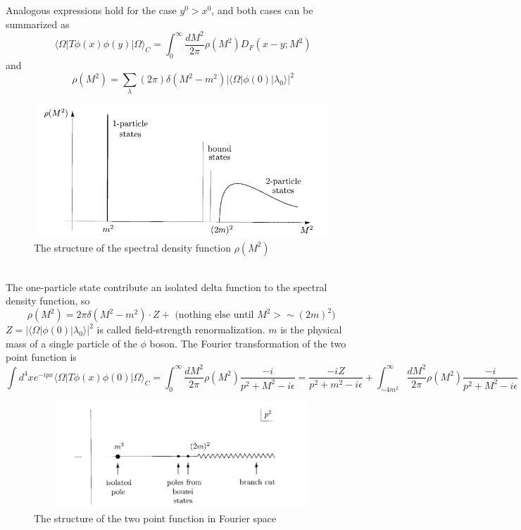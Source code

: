 \documentclass{article}
\begin{document}
Analogous expressions hold for the case $y^0 > x^0$, and both cases can be summarized as
\[\langle \Omega | T \phi(x) \phi(y) | \Omega \rangle_C = \int_0^{\infty} \frac{dM^2}{2\pi} \rho(M^2) D_F(x-y;M^2)\]
and 
\[\rho(M^2) = \sum_{\lambda} (2\pi) \delta(M^2-m^2)|\langle \Omega | \phi(0) | \lambda_0 \rangle|^2 \]
\begin{figure}[!h]
\centering
\includegraphics[height=5cm ,width=12cm]{./pic/FSR2.png}
\caption*{The structure of the spectral density function $\rho(M^2)$}
\end{figure}\\
The one-particle state contribute an isolated delta function to the spectral density function, so
\[\rho(M^2) = 2\pi \delta (M^2 -m^2) \cdot Z + \mbox{ (nothing else until $M^2 > \sim (2m)^2$) }\]
$Z = |\langle \Omega | \phi(0) | \lambda_0 \rangle|^2$ is called field-strength renormalization. $m$ is the physical mass of a single particle of the $\phi$ boson. The Fourier transformation of the two point function is
\[\int d^4x e^{-ipx} \langle \Omega | T \phi(x) \phi(0) | \Omega \rangle_C  = \int_{0}^{\infty} \frac{dM^2}{2\pi} \rho(M^2) \frac{-i}{p^2+M^2-i\epsilon} = \frac{-iZ}{p^2+m^2-i\epsilon} +  \int_{\sim 4m^2}^{\infty} \frac{dM^2}{2\pi} \rho(M^2) \frac{-i}{p^2+M^2-i\epsilon}\]
\begin{figure}[!h]
\centering
\includegraphics[height=4cm ,width=12cm]{./pic/FSR3.png}
\caption*{The structure of the two point function in Fourier space}
\end{figure}\\
\end{document}

